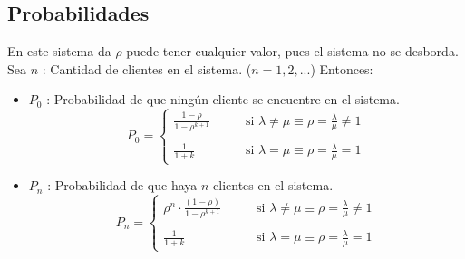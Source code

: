 \documentclass{templateNote}
\begin{document}
\subsection{Probabilidades}
En este sistema da $\rho$ puede tener cualquier valor, pues el sistema no se desborda. \newline
Sea $n$ : Cantidad de clientes en el sistema. ($n=1,2,...$)
Entonces:
\begin{itemize}
    \item $P_0$ : Probabilidad de que ning\'un cliente se encuentre en el sistema.
    \begin{equation*}
        P_0 = \begin{cases}
            \displaystyle \frac{1 - \rho}{1 - \rho^{k + 1}} & \qquad \text{si } \lambda \neq \mu \equiv \rho = \frac{\lambda}{\mu} \neq 1 \\
            \\
            \displaystyle \frac{1}{1 + k} & \qquad \text{si } \lambda = \mu \equiv \rho = \frac{\lambda}{\mu} = 1
        \end{cases}
    \end{equation*}
    
    \item $P_n$ : Probabilidad de que haya $n$ clientes en el sistema.
    \begin{equation*}
        P_n = \begin{cases}
            \displaystyle \rho^n \cdot \frac{(1 - \rho)}{1 - \rho^{k + 1}} & \qquad \text{si } \lambda \neq \mu \equiv \rho = \frac{\lambda}{\mu} \neq 1 \\
            \\
            \displaystyle \frac{1}{1 + k} & \qquad \text{si } \lambda = \mu \equiv \rho = \frac{\lambda}{\mu} = 1
        \end{cases}
    \end{equation*}
\end{itemize}

\newpage
\end{document}

